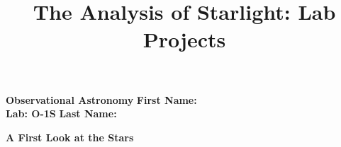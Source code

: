 \documentclass[12pt]{article}
\title{The Analysis of Starlight: Lab Projects}
\begin{document}
\setcounter{page}{1}
\setcounter{equation}{0}
\pagestyle{plain}
\thispagestyle{empty}  %

\def\lo {\ifmmode {\,{\it L}\solar} \else $\,L$\solar\fi}       %
\def\my {\ifmmode {\,{\it M}\solar\,{\rm yr^{-1}}}              %
        \else {$\,M$\solar$\,$yr$^{\rm -1}$}\fi}
\def\arcsec{\ifmmode {^{\scriptscriptstyle\prime\prime}}
          \else $^{\scriptscriptstyle\prime\prime}$\fi}
\def\arcminm{\ifmmode {^{\scriptscriptstyle\prime}}
          \else $^{\scriptscriptstyle\prime}$\fi}
\def\deg{\ifmmode^\circ\else$^\circ$\fi}



\noindent
{\bf Observational Astronomy    \hfill} {\bf First Name:\makebox[4cm]{\hrulefill}}\\
{\bf Lab: O-1S} \hfill {\bf Last Name:\makebox[4cm]{\hrulefill}}


\bigskip

\medskip

\noindent
{\hfill \Large {\bf A First Look at the Stars} \hfill}


\end{document}

